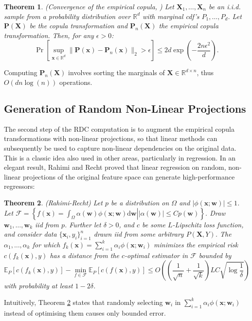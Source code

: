 \documentclass{article}
\newtheorem{theorem}{Theorem}
\begin{document}
\begin{theorem}
  (Convergence of the empirical copula, \cite[Lemma 7]{Poczos12}) Let $\bm X_1,
  \ldots, \bm X_n$ be an i.i.d. sample from a probability distribution over
  $\mathbb{R}^d$ with marginal cdf's $P_1, \ldots, P_d$. Let $\bm P(\bm X)$ be
  the copula transformation and $\bm P_n(\bm X)$ the empirical copula
  transformation. Then, for any $\epsilon > 0$:
    \begin{equation}
      \Pr \left[ \sup_{\bm x \in \mathbb{R}^d} \| \bm P(\bm x) - \bm P_n(\bm x)
      \|_2 > \epsilon \right] \leq 2 d \exp \left( -\frac{2 n
      \epsilon^2}{d}\right).
    \end{equation}
\end{theorem}
Computing $\bm P_n(\bm X)$ involves sorting the marginals of $\bm X \in
\mathbb{R}^{d\times n}$, thus $O(d n \log (n))$ operations.

\subsection{Generation of Random Non-Linear Projections}
\label{sec:gener-rand-non}
The second step of the RDC computation is to augment the empirical copula
transformations with non-linear projections, so that linear methods can
subsequently be used to capture non-linear dependencies on the original data.
This is a classic idea also used in other areas, particularly in regression. In
an elegant result, Rahimi and Recht \cite{Rahimi08} proved that linear
regression on random, non-linear projections of the original feature space can
generate high-performance regressors:
\begin{theorem}\label{thm:rahimi}
(Rahimi-Recht) 
Let $p$ be a distribution on $\Omega$ and $|\phi(\bm x; \bm w)| \leq 1$.
%
Let $\mathcal{F} = \left\lbrace \left. f(\bm x) = \int_\Omega
    \alpha(\bm w) \phi(\bm x; \bm w) \mathrm{d}\bm w \right|
  |\alpha(\bm w)| \leq C p(\bm w)\right\rbrace$.
%
Draw $\bm w_1, \ldots, \bm w_k$ iid from $p$.
%
Further let $\delta > 0$, and $c$ be some $L$-Lipschitz loss function,
and consider data $\{\bm x_i, y_i\}_{i=1}^n$ drawn iid from some
arbitrary $P(\bm X,Y)$. The $\alpha_1, \ldots, \alpha_k$ for which
${f}_k(\bm x) = \sum_{i=1}^k \alpha_i \phi(\bm x; \bm w_i)$ minimizes
the empirical risk $c(f_k(\bm x),y)$ has a distance from the $c$-optimal
estimator in $\mathcal{F}$ bounded by
\begin{equation}
 \mathbb{E}_P[c({f}_k(\bm x),y)] - \min_{f\in \mathcal{F}}
 \mathbb{E}_P[c(f(\bm x),y)] \leq O\left(\left( \frac{1}{\sqrt{n}} +
 \frac{1}{\sqrt{k}} \right) LC\sqrt{\log \frac{1}{\delta}}\right)
\end{equation}
with probability at least $1-2\delta$.
\end{theorem}
Intuitively, Theorem \ref{thm:rahimi} states that randomly selecting $\bm w_i$
in $\sum_{i=1}^k \alpha_i \phi(\bm x; \bm w_i)$ instead of optimising them
causes only bounded error.
\end{document}
